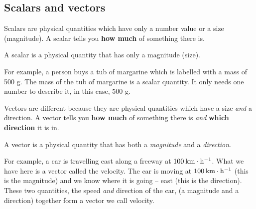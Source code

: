 \subsection*{Scalars and vectors}
            \nopagebreak

Scalars are physical quantities which have only a number value or a size (magnitude). A scalar tells you \textbf{how much} of something there is. 

 {A scalar is a physical quantity that has only a magnitude (size).  } 

For example, a person buys a tub of margarine which is labelled with a mass of 500 g. The mass of the tub of margarine is a scalar quantity. It only needs one number to describe it, in this case, 500 g.  

Vectors are different because they are physical quantities which have a size \textit{and} a direction. A vector tells you \textbf{how much} of something there is \textit{and} \textbf{which direction} it is in.

 {A vector is a physical quantity that has both a \textit{magnitude} and a \textit{direction}.  }



 

For example, a car is travelling east along a freeway at $100\phantom{\rule{2pt}{0ex}}\text{km}\ensuremath{\cdot}\text{h}{}^{-1}$. What we have here is a vector called the velocity. The car is moving at $100\phantom{\rule{2pt}{0ex}}\text{km}\ensuremath{\cdot}\text{h}{}^{-1}$ (this is the magnitude) and we know where it is going -- east (this is the direction). These two quantities, the speed \textit{and} direction of the car, (a magnitude and a direction) together form a vector we call velocity.

